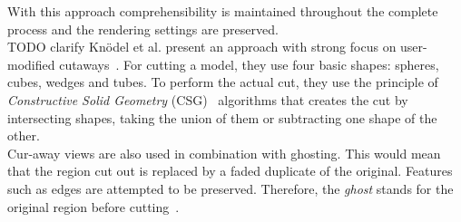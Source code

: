 With this approach comprehensibility is maintained throughout the complete process and the rendering settings are preserved.\\
TODO clarify
\newline
Kn{\"o}del et al. present an approach with strong focus on user-modified cutaways~\cite{incoll:cutawayIllustration}. For cutting a model, they use four basic shapes: spheres, cubes, wedges and tubes. To perform the actual cut, they use the principle of \emph{Constructive Solid Geometry} (CSG)~\cite{book:computerGraphicsHearn}\cite{book:computerGraphicsHill} algorithms that creates the cut by intersecting shapes, taking the union of them or subtracting one shape of the other.\\
\newline
Cur-away views are also used in combination with ghosting. This would mean that the region cut out is replaced by a faded duplicate of the original. Features such as edges are attempted to be preserved. Therefore, the \emph{ghost} stands for the original region before cutting~\cite{proc:volumeshop}.\\

